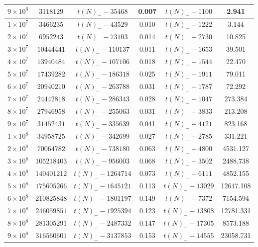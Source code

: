\documentclass[12pt,a4paper,reqno]{amsart}
\numberwithin{equation}{section}
\theoremstyle{plain}
\theoremstyle{definition}
\begin{document}
\begin{table}[htp!]
\begin{tabular}{|c|c|c|c|c|c|}
$9 \times 10^6$ & $\num{3118129}$ & $t(N)_- - \num{35468}$ & 0.007 & $t(N)_- - \num{1100}$ & 2.941 \\\hline
\rule{0pt}{12pt}$1 \times 10^7$ & $\num{3466235}$ & $t(N)_- - \num{43529}$ & 0.010 & $t(N)_- - \num{1222}$ & 3.144 \\
$2 \times 10^7$ & $\num{6952243}$ & $t(N)_- - \num{73103}$ & 0.014 & $t(N)_- - \num{2730}$ & 10.825 \\
$3 \times 10^7$ & $\num{10444441}$ & $t(N)_- - \num{110137}$ & 0.011 & $t(N)_- - \num{1653}$ & 39.501 \\
$4 \times 10^7$ & $\num{13940484}$ & $t(N)_- - \num{107106}$ & 0.018 & $t(N)_- - \num{1544}$ & 22.470 \\
$5 \times 10^7$ & $\num{17439282}$ & $t(N)_- - \num{186318}$ & 0.025 & $t(N)_- - \num{1911}$ & 79.011 \\
$6 \times 10^7$ & $\num{20940210}$ & $t(N)_- - \num{263788}$ & 0.031 & $t(N)_- - \num{1787}$ & 72.292 \\
$7 \times 10^7$ & $\num{24442818}$ & $t(N)_- - \num{286343}$ & 0.028 & $t(N)_- - \num{1047}$ & 273.384 \\
$8 \times 10^7$ & $\num{27946958}$ & $t(N)_- - \num{255063}$ & 0.031 & $t(N)_- - \num{3833}$ & 213.208 \\
$9 \times 10^7$ & $\num{31452431}$ & $t(N)_- - \num{335639}$ & 0.041 & $t(N)_- - \num{4121}$ & 823.168 \\\hline
\rule{0pt}{12pt}$1 \times 10^8$ & $\num{34958725}$ & $t(N)_- - \num{342699}$ & 0.027 & $t(N)_- - \num{2785}$ & 331.221 \\
$2 \times 10^8$ & $\num{70064782}$ & $t(N)_- - \num{738180}$ & 0.063 & $t(N)_- - \num{4800}$ & 4531.127 \\
$3 \times 10^8$ & $\num{105218403}$ & $t(N)_- - \num{956003}$ & 0.068 & $t(N)_- - \num{3502}$ & 2488.738 \\
$4 \times 10^8$ & $\num{140401212}$ & $t(N)_- - \num{1264714}$ & 0.073 & $t(N)_- - \num{6111}$ & 4852.155 \\
$5 \times 10^8$ & $\num{175605266}$ & $t(N)_- - \num{1645121}$ & 0.113 & $t(N)_- - \num{13029}$ & 12647.108 \\
$6 \times 10^8$ & $\num{210825848}$ & $t(N)_- - \num{1801197}$ & 0.149 & $t(N)_- - \num{7372}$ & 7154.594 \\
$7 \times 10^8$ & $\num{246059851}$ & $t(N)_- - \num{1925394}$ & 0.123 & $t(N)_- - \num{13808}$ & 12781.331 \\
$8 \times 10^8$ & $\num{281305291}$ & $t(N)_- - \num{2487332}$ & 0.147 & $t(N)_- - \num{17305}$ & 8573.188 \\
$9 \times 10^8$ & $\num{316560601}$ & $t(N)_- - \num{3137853}$ & 0.153 & $t(N)_- - \num{14555}$ & 23058.731 \\\hline
\end{tabular}
\bigskip


\end{table}
\end{document}
